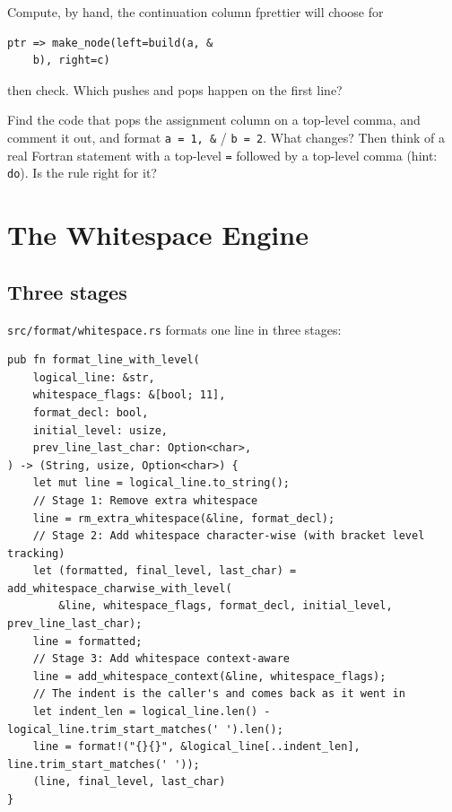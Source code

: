 \documentclass[11pt,a4paper,openany]{book}
\newcommand{\code}[1]{\texttt{\small #1}}
\newcommand{\file}[1]{\texttt{\small\color{accent}#1}}
\newcounter{exercise}[chapter]
\begin{document}
\begin{exercise}
Compute, by hand, the continuation column fprettier will choose for
\begin{lstlisting}[style=fortran]
    ptr => make_node(left=build(a, &
    b), right=c)
\end{lstlisting}
then check. Which pushes and pops happen on the first line?
\end{exercise}

\begin{exercise}
Find the code that pops the assignment column on a top-level comma, and
comment it out, and format \code{a = 1, \&} / \code{b = 2}. What changes?
Then think of a real Fortran statement with a top-level \code{=} followed by a
top-level comma (hint: \code{do}). Is the rule right for it?
\end{exercise}
\chapter{The Whitespace Engine}\label{ch:ws-engine}

\section{Three stages}\label{sec:ws-stages}

\file{src/format/whitespace.rs} formats one line in three stages:

\begin{lstlisting}[style=rust]
pub fn format_line_with_level(
    logical_line: &str,
    whitespace_flags: &[bool; 11],
    format_decl: bool,
    initial_level: usize,
    prev_line_last_char: Option<char>,
) -> (String, usize, Option<char>) {
    let mut line = logical_line.to_string();
    // Stage 1: Remove extra whitespace
    line = rm_extra_whitespace(&line, format_decl);
    // Stage 2: Add whitespace character-wise (with bracket level tracking)
    let (formatted, final_level, last_char) = add_whitespace_charwise_with_level(
        &line, whitespace_flags, format_decl, initial_level, prev_line_last_char);
    line = formatted;
    // Stage 3: Add whitespace context-aware
    line = add_whitespace_context(&line, whitespace_flags);
    // The indent is the caller's and comes back as it went in
    let indent_len = logical_line.len() - logical_line.trim_start_matches(' ').len();
    line = format!("{}{}", &logical_line[..indent_len], line.trim_start_matches(' '));
    (line, final_level, last_char)
}
\end{lstlisting}
\end{document}
